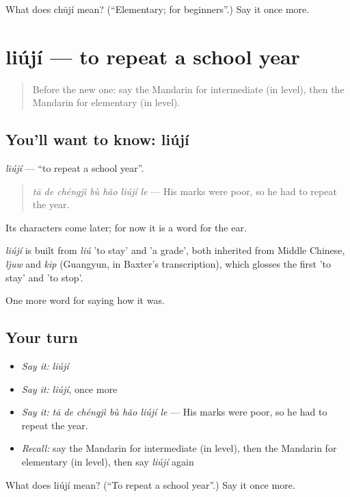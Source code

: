 \begin{tcolorbox}[breakable,colback=teal!4,colframe=teal!35!black,title={Before you move on}]
What does chūjí mean? (\textquotedblleft{}Elementary; for beginners\textquotedblright{}.) Say it once more.
\end{tcolorbox}
\section[liújí]{liújí — to repeat a school year}

\label{lesson:ZH-C496-liuji}



\begin{quote}
Before the new one: say the Mandarin for intermediate (in level), then the Mandarin for elementary (in level).
\end{quote}

\subsection*{You'll want to know: liújí}
\emph{liújí} — \textquotedblleft{}to repeat a school year\textquotedblright{}.

\begin{quote}
\emph{tā de chéngjì bù hǎo liújí le} — His marks were poor, so he had to repeat the year.
\end{quote}

Its characters come later; for now it is a word for the ear.

\begin{cousinweb}
\emph{liújí} is built from \emph{liú} 'to stay' and  'a grade', both inherited from Middle Chinese, \emph{ljuw} and \emph{kip} (Guangyun, in Baxter's transcription), which glosses the first 'to stay' and 'to stop'.
\end{cousinweb}

\begin{grammarlens}[title={What you've built}]
One more word for saying how it was.
\end{grammarlens}

\subsection*{Your turn}
\begin{itemize}
\raggedright
  \item \emph{Say it:} \emph{liújí}
  \item \emph{Say it:} \emph{liújí}, once more
  \item \emph{Say it:} \emph{tā de chéngjì bù hǎo liújí le} — His marks were poor, so he had to repeat the year.
  \item \emph{Recall:} say the Mandarin for intermediate (in level), then the Mandarin for elementary (in level), then say \emph{liújí} again
\end{itemize}

\begin{tcolorbox}[breakable,colback=teal!4,colframe=teal!35!black,title={Before you move on}]
What does liújí mean? (\textquotedblleft{}To repeat a school year\textquotedblright{}.) Say it once more.
\end{tcolorbox}
